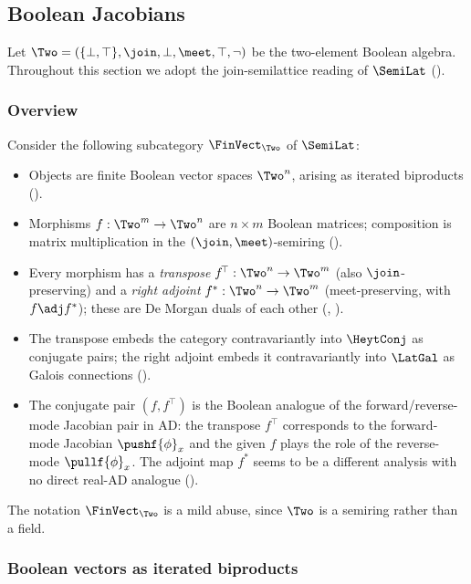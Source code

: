 \subsection{Boolean Jacobians}
\label{sec:boolean-jacobians}

Let $\Two = (\{\bot, \top\}, \join, \bot, \meet, \top, \neg)$ be the two-element Boolean algebra. Throughout
this section we adopt the join-semilattice reading of $\SemiLat$ ().

\subsubsection{Overview}
\label{sec:boolean-jacobians:overview}

Consider the following subcategory $\FinVect_\Two$ of $\SemiLat$:

\begin{itemize}
\item Objects are finite Boolean vector spaces $\Two^n$, arising as iterated biproducts
().
\item Morphisms $f: \Two^m \to \Two^n$ are $n \times m$ Boolean matrices; composition is matrix multiplication
in the $(\join, \meet)$-semiring ().
\item Every morphism has a \emph{transpose} $f^{\!\top}: \Two^n \to \Two^m$ (also $\join$-preserving) and a
\emph{right adjoint} $f^*: \Two^n \to \Two^m$ (meet-preserving, with $f \adj f^*$); these are De Morgan
duals of each other (, ).
\item The transpose embeds the category contravariantly into $\HeytConj$ as conjugate pairs; the right
adjoint embeds it contravariantly into $\LatGal$ as Galois connections
().
\item The conjugate pair $(f, f^{\!\top})$ is the Boolean analogue of the forward/reverse-mode Jacobian pair
in AD: the transpose $f^{\!\top}$ corresponds to the forward-mode Jacobian $\pushf{\phi}_x$ and the given $f$
plays the role of the reverse-mode $\pullf{\phi}_x$. The adjoint map $f^*$ seems to be a different analysis
with no direct real-AD analogue ().
\end{itemize}

\noindent The notation $\FinVect_\Two$ is a mild abuse, since $\Two$ is a semiring rather than a field.

\subsubsection{Boolean vectors as iterated biproducts}
\label{sec:boolean-jacobians:vectors}

